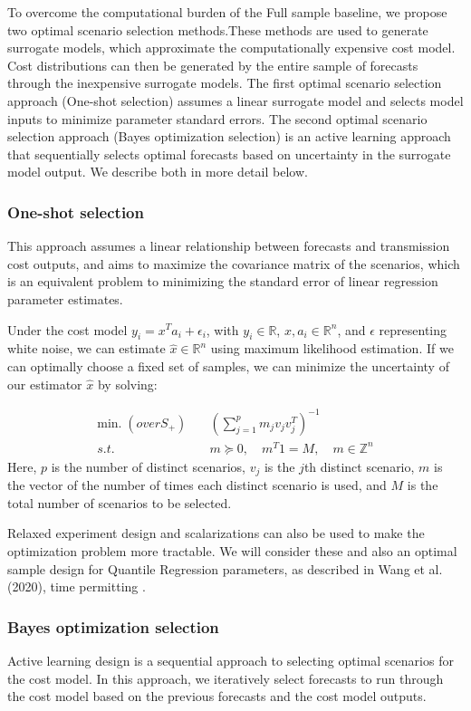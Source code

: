 \documentclass[10pt,twocolumn,letterpaper]{article}
\begin{document}
To overcome the computational burden of the Full sample baseline, we propose two optimal scenario selection methods.These methods are used to generate surrogate models, which approximate the computationally expensive cost model. Cost distributions can then be generated by the entire sample of forecasts through the inexpensive surrogate models. The first optimal scenario selection approach (One-shot selection) assumes a linear surrogate model and selects model inputs to minimize parameter standard errors. The second optimal scenario selection approach (Bayes optimization selection) is an active learning approach that sequentially selects optimal forecasts based on uncertainty in the surrogate model output. We describe both in more detail below. 

\subsubsection{One-shot selection}
This approach assumes a linear relationship between forecasts and transmission cost outputs, and aims to maximize the covariance matrix of the scenarios, which is an equivalent problem to minimizing the standard error of linear regression parameter estimates. 

Under the cost model $y_i = x^Ta_i + \epsilon_i$, with $y_i \in \mathbb{R}$, $x, a_i \in \mathbb{R}^n$, and $\epsilon$ representing white noise, we can estimate $\hat{x}\in \mathbb{R}^n$ using maximum likelihood estimation. If we can optimally choose a fixed set of samples, we can minimize the uncertainty of our estimator $\hat{x}$ by solving:

\begin{align*}
\textrm{min.} \;(over S_+) \quad & \left(\sum_{j=1}^pm_jv_jv_j^T\right)^{-1}\\
s.t. \quad & m \succeq 0, \quad m^T1 = M, \quad m \in \mathbb{Z}^n
\end{align*}
Here, $p$ is the number of distinct scenarios, $v_j$ is the $j$th distinct scenario, $m$ is the vector of the number of times each distinct scenario is used, and $M$ is the total number of scenarios to be selected.

Relaxed experiment design and scalarizations can also be used to make the optimization problem more tractable. We will consider these and also an optimal sample design for Quantile Regression parameters, as described in Wang et al. (2020), time permitting \cite{wang2020optimal}.

\subsubsection{Bayes optimization selection}
Active learning design is a sequential approach to selecting optimal scenarios for the cost model. In this approach, we iteratively select forecasts to run through the cost model based on the previous forecasts and the cost model outputs.
\end{document}
